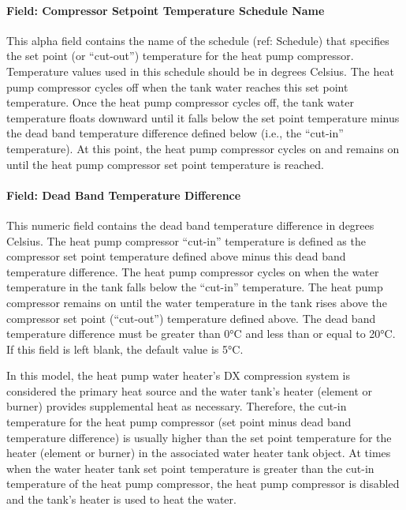 \paragraph{Field: Compressor Setpoint Temperature Schedule Name}\label{field-compressor-setpoint-temperature-schedule-name-1}

This alpha field contains the name of the schedule (ref: Schedule) that specifies the set point (or ``cut-out'') temperature for the heat pump compressor. Temperature values used in this schedule should be in degrees Celsius. The heat pump compressor cycles off when the tank water reaches this set point temperature. Once the heat pump compressor cycles off, the tank water temperature floats downward until it falls below the set point temperature minus the dead band temperature difference defined below (i.e., the ``cut-in'' temperature). At this point, the heat pump compressor cycles on and remains on until the heat pump compressor set point temperature is reached.

\paragraph{Field: Dead Band Temperature Difference}\label{field-dead-band-temperature-difference-1}

This numeric field contains the dead band temperature difference in degrees Celsius. The heat pump compressor ``cut-in'' temperature is defined as the compressor set point temperature defined above minus this dead band temperature difference. The heat pump compressor cycles on when the water temperature in the tank falls below the ``cut-in'' temperature. The heat pump compressor remains on until the water temperature in the tank rises above the compressor set point (``cut-out'') temperature defined above. The dead band temperature difference must be greater than 0°C and less than or equal to 20°C. If this field is left blank, the default value is 5°C.

In this model, the heat pump water heater's DX compression system is considered the primary heat source and the water tank's heater (element or burner) provides supplemental heat as necessary. Therefore, the cut-in temperature for the heat pump compressor (set point minus dead band temperature difference) is usually higher than the set point temperature for the heater (element or burner) in the associated water heater tank object. At times when the water heater tank set point temperature is greater than the cut-in temperature of the heat pump compressor, the heat pump compressor is disabled and the tank's heater is used to heat the water.

